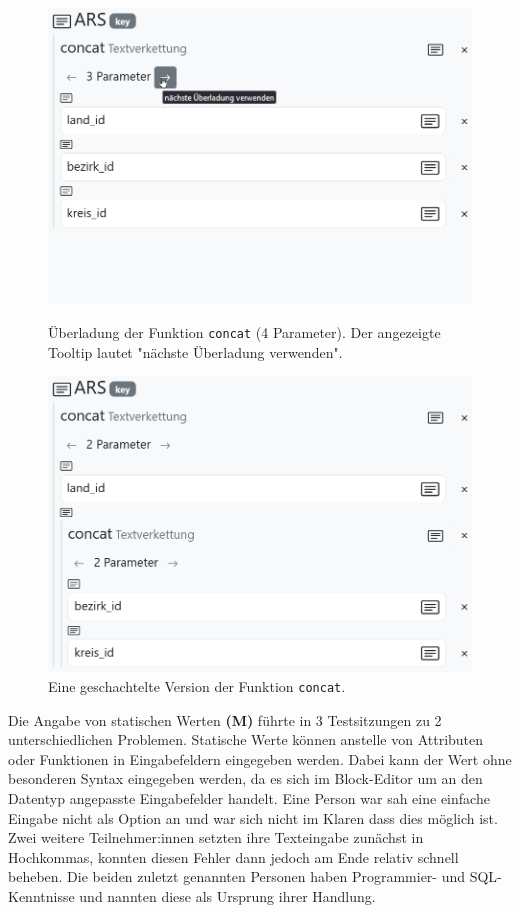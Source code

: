 \begin{figure}[!ht]
  \includegraphics[width=\linewidth]{assets/concat-overload.png}
  \caption{Überladung der Funktion \texttt{concat} (4 Parameter). Der angezeigte Tooltip lautet "nächste Überladung verwenden".}
  \label{fig:concat-overload}
  \endminipage
  \hfill
  \includegraphics[width=\linewidth]{assets/concat-nested.png}
  \caption{Eine geschachtelte Version der Funktion \texttt{concat}.}
  \label{fig:concat-nested}
  \endminipage
\end{figure}

Die Angabe von statischen Werten \textbf{(M)} führte in 3 Testsitzungen zu 2 unterschiedlichen Problemen. Statische Werte können anstelle von Attributen oder Funktionen in Eingabefeldern eingegeben werden. Dabei kann der Wert ohne besonderen Syntax eingegeben werden, da es sich im Block-Editor um an den Datentyp angepasste Eingabefelder handelt. Eine Person war sah eine einfache Eingabe nicht als Option an und war sich nicht im Klaren dass dies möglich ist. Zwei weitere Teilnehmer:innen setzten ihre Texteingabe zunächst in Hochkommas, konnten diesen Fehler dann jedoch am Ende relativ schnell beheben. Die beiden zuletzt genannten Personen haben Programmier- und \ac{SQL}-Kenntnisse und nannten diese als Ursprung ihrer Handlung.

